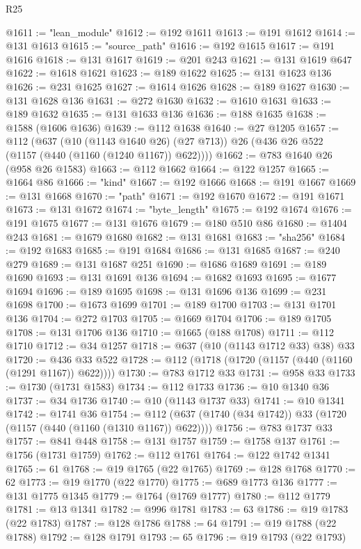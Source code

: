 \begin{lexlean}{R25}
\begin{coremodule}
@1611 := "lean_module"
@1612 := @192 @1611
@1613 := @191 @1612
@1614 := @131 @1613
@1615 := "source_path"
@1616 := @192 @1615
@1617 := @191 @1616
@1618 := @131 @1617
@1619 := @201 @243
@1621 := @131 @1619 @647
@1622 := @1618 @1621
@1623 := @189 @1622
@1625 := @131 @1623 @136
@1626 := @231 @1625
@1627 := @1614 @1626
@1628 := @189 @1627
@1630 := @131 @1628 @136
@1631 := @272 @1630
@1632 := @1610 @1631
@1633 := @189 @1632
@1635 := @131 @1633 @136
@1636 := @188 @1635
@1638 := @1588 (@1606 @1636)
@1639 := @112 @1638
@1640 := @27 @1205
@1657 := @112
    (@637
      (@10 (@1143 @1640 @26) (@27 @713))
      @26
      (@436 @26 @522 (@1157 (@440 (@1160 (@1240 @1167)) @622))))
@1662 := @783 @1640 @26 (@958 @26 @1583)
@1663 := @112 @1662
@1664 := @122 @1257
@1665 := @1664 @86
@1666 := "kind"
@1667 := @192 @1666
@1668 := @191 @1667
@1669 := @131 @1668
@1670 := "path"
@1671 := @192 @1670
@1672 := @191 @1671
@1673 := @131 @1672
@1674 := "byte_length"
@1675 := @192 @1674
@1676 := @191 @1675
@1677 := @131 @1676
@1679 := @180 @510 @86
@1680 := @1404 @243
@1681 := @1679 @1680
@1682 := @131 @1681
@1683 := "sha256"
@1684 := @192 @1683
@1685 := @191 @1684
@1686 := @131 @1685
@1687 := @240 @279
@1689 := @131 @1687 @251
@1690 := @1686 @1689
@1691 := @189 @1690
@1693 := @131 @1691 @136
@1694 := @1682 @1693
@1695 := @1677 @1694
@1696 := @189 @1695
@1698 := @131 @1696 @136
@1699 := @231 @1698
@1700 := @1673 @1699
@1701 := @189 @1700
@1703 := @131 @1701 @136
@1704 := @272 @1703
@1705 := @1669 @1704
@1706 := @189 @1705
@1708 := @131 @1706 @136
@1710 := @1665 (@188 @1708)
@1711 := @112 @1710
@1712 := @34 @1257
@1718 := @637 (@10 (@1143 @1712 @33) @38) @33
@1720 := @436 @33 @522
@1728 := @112 (@1718 (@1720 (@1157 (@440 (@1160 (@1291 @1167)) @622))))
@1730 := @783 @1712 @33
@1731 := @958 @33
@1733 := @1730 (@1731 @1583)
@1734 := @112 @1733
@1736 := @10 @1340 @36
@1737 := @34 @1736
@1740 := @10 (@1143 @1737 @33)
@1741 := @10 @1341
@1742 := @1741 @36
@1754 := @112 (@637 (@1740 (@34 @1742)) @33 (@1720 (@1157 (@440 (@1160 (@1310 @1167)) @622))))
@1756 := @783 @1737 @33
@1757 := @841 @448
@1758 := @131 @1757
@1759 := @1758 @137
@1761 := @1756 (@1731 @1759)
@1762 := @112 @1761
@1764 := @122 @1742 @1341
@1765 := 61
@1768 := @19 @1765 (@22 @1765)
@1769 := @128 @1768
@1770 := 62
@1773 := @19 @1770 (@22 @1770)
@1775 := @689 @1773 @136
@1777 := @131 @1775 @1345
@1779 := @1764 (@1769 @1777)
@1780 := @112 @1779
@1781 := @13 @1341
@1782 := @996 @1781
@1783 := 63
@1786 := @19 @1783 (@22 @1783)
@1787 := @128 @1786
@1788 := 64
@1791 := @19 @1788 (@22 @1788)
@1792 := @128 @1791
@1793 := 65
@1796 := @19 @1793 (@22 @1793)

\end{coremodule}
\end{lexlean}
